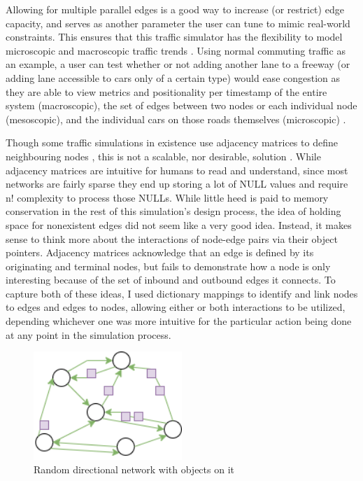 \par Allowing for multiple parallel edges is a good way to increase (or restrict) edge capacity, and serves as another parameter the user can tune to mimic real-world constraints.  This ensures that this traffic simulator has the flexibility to model microscopic and macroscopic traffic trends \cite{LWB18}.  Using normal commuting traffic as an example, a user can test whether or not adding another lane to a freeway (or adding lane accessible to cars only of a certain type) would ease congestion as they are able to view metrics and positionality per timestamp of the entire system (macroscopic), the set of edges between two nodes or each individual node (mesoscopic), and the individual cars on those roads themselves (microscopic) \cite{LWB18}. \\


\par Though some traffic simulations in existence use adjacency matrices to define neighbouring nodes \cite{GPK02}, this is not a scalable, nor desirable, solution .  While adjacency matrices are intuitive for humans to read and understand, since most networks are fairly sparse they end up storing a lot of NULL values and require n! complexity to process those NULLs.  While little heed is paid to memory conservation in the rest of this simulation's design process, the idea of holding space for nonexistent edges did not seem like a very good idea.  Instead, it makes sense to think more about the interactions of node-edge pairs via their object pointers.  Adjacency matrices acknowledge that an edge is defined by its originating and terminal nodes, but fails to demonstrate how a node is only interesting because of the set of inbound and outbound edges it connects.  To capture both of these ideas, I used dictionary mappings to identify and link nodes to edges and edges to nodes, allowing either or both interactions to be utilized, depending whichever one was more intuitive for the particular action being done at any point in the simulation process.\\

\begin{figure}[H]
    \centering
	\includegraphics[width=0.5\textwidth]{tex files/Figures/generic_network.png}
	\caption[Random directional network]{Random directional network with objects on it}
	\label{fig:generic_network}
\end{figure}


